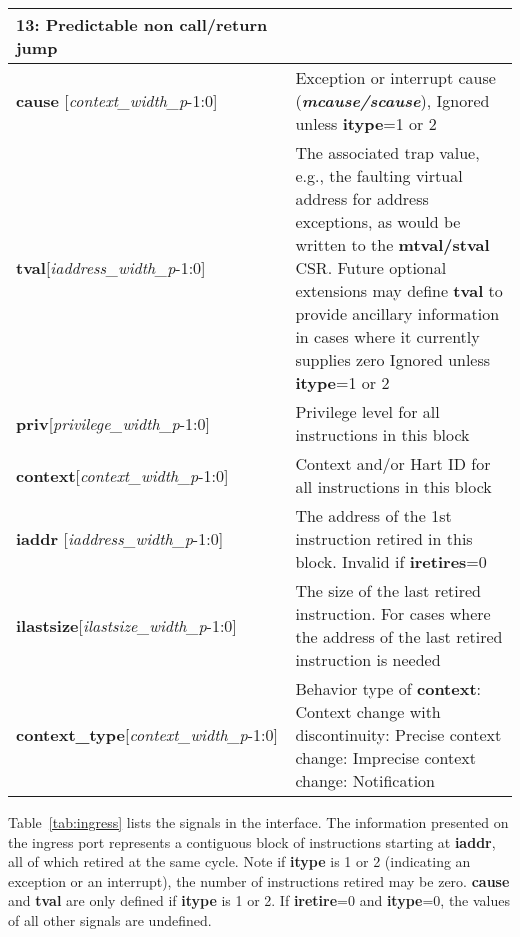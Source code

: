 \begin{table}[htp]
\begin{tabulary}{\textwidth}{|l|p{80mm}|}
        13: Predictable non call/return jump\\
        \hline
        \textbf {cause} [\textit{context\_width\_p}-1:0] & Exception or interrupt cause (\textbf{\textit{mcause/scause}}), \newline
        Ignored unless \textbf {itype}=1 or 2\\
        \hline
        \textbf {tval}[\textit{iaddress\_width\_p}-1:0]& The associated trap value, e.g., the
    faulting virtual address for address exceptions, as would be
    written to the \textbf {mtval/stval} CSR. Future optional extensions may define \textbf {tval} to provide ancillary information in cases where it currently supplies zero\newline
    Ignored unless \textbf {itype}=1 or 2\\
        \hline
        \textbf {priv}[\textit{privilege\_width\_p}-1:0] & Privilege level for all instructions in this block\\
        \hline
        \textbf {context}[\textit{context\_width\_p}-1:0] & Context and/or Hart ID for all instructions in this block\\
        \hline
        \textbf {iaddr} [\textit{iaddress\_width\_p}-1:0] & The address of the 1st instruction retired in this block.\newline
        Invalid if \textbf{iretires}=0 \\
        \hline
        \textbf {ilastsize}[\textit{ilastsize\_width\_p}-1:0] & The size of the last retired instruction. For cases where the address of the last retired instruction is needed\\
        \hline
        \textbf {context\_type}[\textit{context\_width\_p}-1:0] & Behavior type of \textbf {context}: Context change with discontinuity: Precise context change: Imprecise context change: Notification\\
        \hline
    \end{tabulary}
\end{table}

Table~\ref{tab:ingress} lists the signals in the interface. The
information presented on the ingress port represents a contiguous
block of instructions starting at \textbf{iaddr}, all of which retired
at the same cycle. Note if \textbf{itype} is 1 or 2 (indicating an
exception or an interrupt), the number of instructions retired may be
zero. \textbf{cause} and \textbf{tval} are only defined if
\textbf{itype} is 1 or 2. If \textbf {iretire}=0 and \textbf{itype}=0,
the values of all other signals are undefined.


